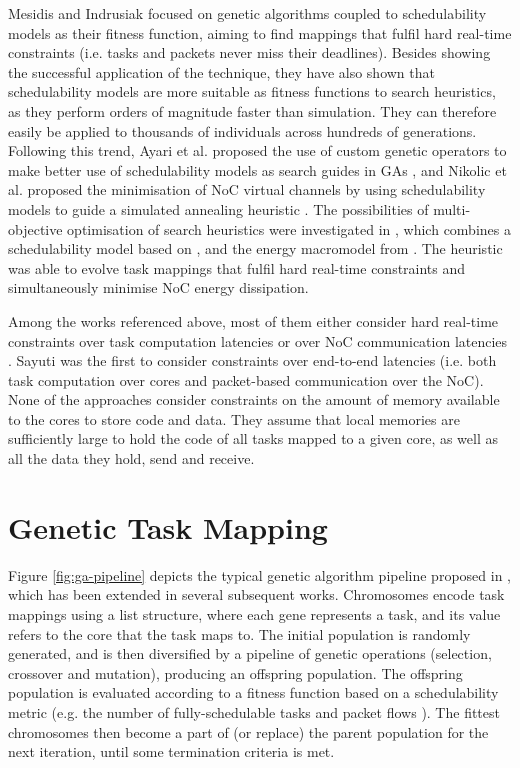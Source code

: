 \documentclass[10pt,conference]{IEEEtran}
\begin{document}
Mesidis and Indrusiak \cite{Mesidis11} focused on genetic algorithms coupled to schedulability models as their fitness function, aiming to find mappings that fulfil hard real-time constraints (i.e. tasks and packets never miss their deadlines). Besides showing the successful application of the technique, they have also shown that schedulability models are more suitable as fitness functions to search heuristics, as they perform orders of magnitude faster than simulation. They can therefore easily be applied to thousands of individuals across hundreds of generations. Following this trend, Ayari et al. proposed the use of custom genetic operators to make better use of schedulability models as search guides in GAs \cite{Ayari16}, and Nikolic et al. proposed the minimisation of NoC virtual channels by using schedulability models to guide a simulated annealing heuristic \cite{Nikolic13}. The possibilities of multi-objective optimisation of search heuristics were investigated in \cite{Sayuti13}, which combines a schedulability model based on \cite{Shi08}, and the energy macromodel from \cite{Palesi11}. The heuristic was able to evolve task mappings that fulfil hard real-time constraints and simultaneously minimise NoC energy dissipation.

Among the works referenced above, most of them either consider hard real-time constraints over task computation latencies \cite{Ayari16} or over NoC communication latencies \cite{Nikolic13, Mesidis11}. Sayuti \cite{Sayuti13} was the first to consider constraints over end-to-end latencies (i.e. both task computation over cores and packet-based communication over the NoC). None of the approaches consider constraints on the amount of memory available to the cores to store code and data. They assume that local memories are sufficiently large to hold the code of all tasks mapped to a given core, as well as all the data they hold, send and receive.

\section{Genetic Task Mapping}\label{sec:genetic-task-mapping}

Figure \ref{fig:ga-pipeline} depicts the typical genetic algorithm pipeline proposed in \cite{Mesidis11}, which has been extended in several subsequent works. Chromosomes encode task mappings using a list structure, where each gene represents a task, and its value refers to the core that the task maps to. The initial population is randomly generated, and is then diversified by a pipeline of genetic operations (selection, crossover and mutation), producing an offspring population. The offspring population is evaluated according to a fitness function based on a schedulability metric (e.g. the number of fully-schedulable tasks and packet flows \cite{Mesidis11, Ayari16}). The fittest chromosomes then become a part of (or replace) the parent population for the next iteration, until some termination criteria is met.
\end{document}
